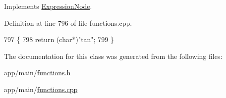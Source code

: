 Implements \hyperlink{classExpressionNode_a42a5e9562b0f645a19dcc83f698069b5}{Expression\+Node}.



Definition at line 796 of file functions.\+cpp.


\begin{DoxyCode}
797 \{
798     \textcolor{keywordflow}{return} (\textcolor{keywordtype}{char}*)\textcolor{stringliteral}{"tan"};
799 \}
\end{DoxyCode}


The documentation for this class was generated from the following files\+:\begin{DoxyCompactItemize}
\item 
app/main/\hyperlink{functions_8h}{functions.\+h}\item 
app/main/\hyperlink{functions_8cpp}{functions.\+cpp}\end{DoxyCompactItemize}
